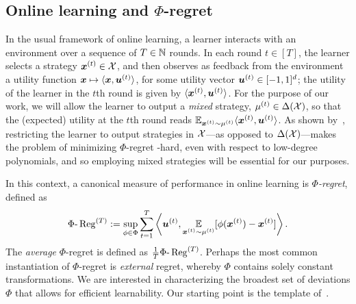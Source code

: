 \subsection{Online learning and $\Phi$-regret}
\label{sec:gordon}

In the usual framework of online learning, a learner interacts with an environment over a sequence of $T \in \mathbb N$ rounds. In each round $t \in [T]$, the learner selects a strategy ${\bm{x}}^{(t)} \in {\mathcal{X}}$, and then observes as feedback from the environment a utility function ${\bm{x}} \mapsto \langle {\bm{x}}, {\bm{u}}^{(t)} \rangle$, for some utility vector ${\bm{u}}^{(t)} \in [-1, 1]^{d}$; the utility of the learner in the $t$th round is given by $\langle {\bm{x}}^{(t)}, {\bm{u}}^{(t)} \rangle$. For the purpose of our work, we will allow the learner to output a \emph{mixed} strategy, $\mu^{(t)} \in \Delta({\mathcal{X}})$, so that the (expected) utility at the $t$th round reads $\operatorname*{\mathbb E}_{ {\bm{x}}^{(t)} \sim \mu^{(t)}} \langle {\bm{x}}^{(t)}, {\bm{u}}^{(t)} \rangle $. As shown by~\citet{Zhang24:Efficient}, restricting the learner to output strategies in ${\mathcal{X}}$---as opposed to $\Delta({\mathcal{X}})$---makes the problem of minimizing $\Phi$-regret \PPAD-hard, even with respect to low-degree polynomials, and so employing mixed strategies will be essential for our purposes.

In this context, a canonical measure of performance in online learning is \emph{$\Phi$-regret}, defined as
\begin{equation}
     \Phi\text{-}\operatorname{Reg}^{(T)} := \sup_{\phi \in \Phi} \sum_{t=1}^T \left\langle {\bm{u}}^{(t)}, \operatorname*{\mathbb E}_{{\bm{x}}^{(t)} \sim \mu^{(t)}} [ \phi({\bm{x}}^{(t)}) - {\bm{x}}^{(t)} ] \right\rangle.
\end{equation}
The \emph{average} $\Phi$-regret is defined as $\frac{1}{T} \Phi\text{-}\operatorname{Reg}^{(T)}$. Perhaps the most common instantiation of $\Phi$-regret is \emph{external} regret, whereby $\Phi$ contains solely constant transformations. We are interested in characterizing the broadest set of deviations $\Phi$ that allows for efficient learnability. Our starting point is the template of~\citet{Gordon08:No}.

